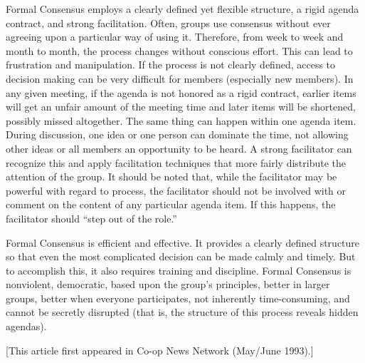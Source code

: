 Formal Consensus employs a clearly defined yet flexible structure, a rigid agenda contract, and strong facilitation. Often, groups use consensus without ever agreeing upon a particular way of using it. Therefore, from week to week and month to month, the process changes without conscious effort. This can lead to frustration and manipulation. If the process is not clearly defined, access to decision making can be very difficult for members (especially new members). In any given meeting, if the agenda is not honored as a rigid contract, earlier items will get an unfair amount of the meeting time and later items will be shortened, possibly missed altogether. The same thing can happen within one agenda item. During discussion, one idea or one person can dominate the time, not allowing other ideas or all members an opportunity to be heard. A strong facilitator can recognize this and apply facilitation techniques that more fairly distribute the attention of the group. It should be noted that, while the facilitator may be powerful with regard to process, the facilitator should not be involved with or comment on the content of any particular agenda item. If this happens, the facilitator should ``step out of the role.''

Formal Consensus is efficient and effective. It provides a clearly defined structure so that even the most complicated decision can be made calmly and timely. But to accomplish this, it also requires training and discipline. Formal Consensus is nonviolent, democratic, based upon the group's principles, better in larger groups, better when everyone participates, not inherently time-consuming, and cannot be secretly disrupted (that is, the structure of this process reveals hidden agendas).

\vspace{1in}

\begin{center}{\scriptsize[This article first appeared in Co-op News Network (May/June 1993).]}\end{center}

